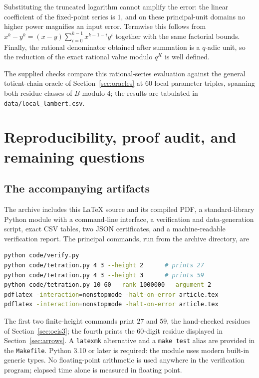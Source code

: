\documentclass[11pt,letterpaper]{article}
\numberwithin{equation}{section}
\theoremstyle{definition}
\theoremstyle{remark}
\begin{document}
Substituting the truncated logarithm cannot amplify the error: the linear coefficient of the fixed-point series is $1$, and on these principal-unit domains no higher power magnifies an input error. Termwise this follows from $x^k-y^k=(x-y)\sum_{i=0}^{k-1}x^{k-1-i}y^i$ together with the same factorial bounds. Finally, the rational denominator obtained after summation is a $q$-adic unit, so the reduction of the exact rational value modulo $q^K$ is well defined.

The supplied checks compare this rational-series evaluation against the general totient-chain oracle of Section~\ref{sec:oracles} at $60$ local parameter triples, spanning both residue classes of $B$ modulo $4$; the results are tabulated in \texttt{data/local\_lambert.csv}.

\section{Reproducibility, proof audit, and remaining questions}\label{sec:repro}

\subsection{The accompanying artifacts}

The archive includes this \LaTeX{} source and its compiled PDF, a standard-library Python module with a command-line interface, a verification and data-generation script, exact CSV tables, two JSON certificates, and a machine-readable verification report. The principal commands, run from the archive directory, are
\begin{lstlisting}[language=bash]
python code/verify.py
python code/tetration.py 4 3 --height 2      # prints 27
python code/tetration.py 4 3 --height 3      # prints 59
python code/tetration.py 10 60 --rank 1000000 --argument 2
pdflatex -interaction=nonstopmode -halt-on-error article.tex
pdflatex -interaction=nonstopmode -halt-on-error article.tex
\end{lstlisting}
The first two finite-height commands print $27$ and $59$, the hand-checked residues of Section~\ref{sec:oeis3}; the fourth prints the $60$-digit residue displayed in Section~\ref{sec:arrows}. A \texttt{latexmk} alternative and a \texttt{make test} alias are provided in the \texttt{Makefile}. Python 3.10 or later is required: the module uses modern built-in generic types. No floating-point arithmetic is used anywhere in the verification program; elapsed time alone is measured in floating point.
\end{document}
